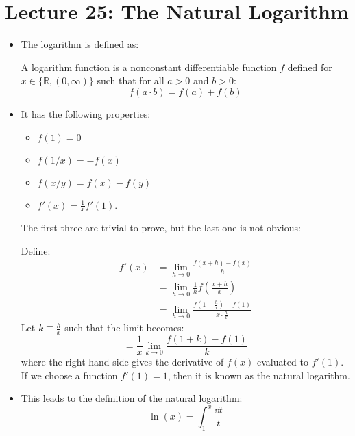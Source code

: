 \section{Lecture 25: The Natural Logarithm}
\begin{itemize}
    \item The logarithm is defined as:
    \begin{definition}
        A logarithm function is a nonconstant differentiable function $f$ defined for $x\in \{\mathbb{R},(0,\infty)\}$ such that for all $a>0$ and $b>0$:
        \begin{equation}
            f(a\cdot b) = f(a)+f(b)
            \label{eq:}
        \end{equation}
    \end{definition}
    \item It has the following properties:
    \begin{itemize}
        \item $f(1)=0$
        \item $f(1/x)=-f(x)$
        \item $f(x/y)=f(x)-f(y)$
        \item $f'(x)=\frac{1}{x}f'(1)$.
    \end{itemize}
    The first three are trivial to prove, but the last one is not obvious:
    \begin{prooof}
        Define:
        \begin{align}
            f'(x)&=\lim_{h\to 0} \frac{f(x+h)-f(x)}{h} \\ 
            &= \lim_{h\to 0} \frac{1}{h}f\left(\frac{x+h}{x}\right) \\ 
            &= \lim_{h\to 0} \frac{f(1+\frac{h}{x})-f(1)}{x\cdot \frac{h}{x}} 
            \label{eq:}
        \end{align}
        Let $k\equiv \frac{h}{x}$ such that the limit becomes:
        \begin{equation}
            = \frac{1}{x} \lim_{k\to 0} \frac{f(1+k)-f(1)}{k}
            \label{eq:}
        \end{equation}
        where the right hand side gives the derivative of $f(x)$ evaluated to $f'(1)$. If we choose a function $f'(1)=1$, then it is known as the natural logarithm.
    \end{prooof}
    \item This leads to the definition of the natural logarithm:
    \begin{equation}
        \ln(x) = \int_1^x \frac{\dd{t}}{t}
        \label{eq:}

\end{equation}
\end{itemize}

